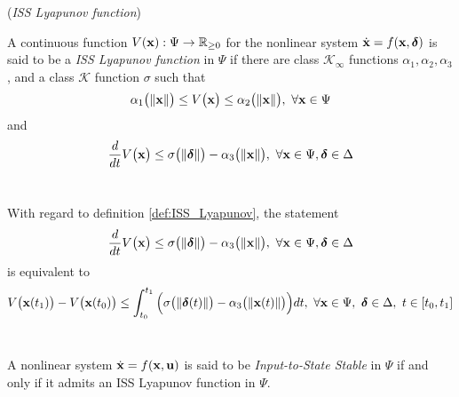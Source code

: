 \begin{definition}\cite{marquez2003nonlinear} (\textit{ISS Lyapunov function})
\label{def:ISS_Lyapunov}

A continuous function $V(\bm{\mathbf{x}}) : \Psi \to \mathbb{R}_{\geq 0}$ for the
nonlinear system $\dot{\bm{\mathbf{x}}} = f(\bm{\mathbf{x}}, \bm{\mathbf{\delta}})$ is said to be a
\textit{ISS Lyapunov function} in $\Psi$ if there are class
$\mathcal{K}_{\infty}$ functions
$\alpha_1, \alpha_2, \alpha_3$, and a class $\mathcal{K}$ function
$\sigma$ such that
\begin{align}
  \alpha_1\big(\|\bm{\mathbf{x}}\|\big) \leq V\big(\bm{\mathbf{x}}\big) \leq \alpha_2\big(\|\bm{\mathbf{x}}\|\big),\ \forall \bm{\mathbf{x}} \in \Psi
\end{align}
and
\begin{align}
  \dfrac{d}{dt}V\big(\bm{\mathbf{x}}\big)
    \leq \sigma\big(\|\bm{\mathbf{\delta}}\|\big) - \alpha_3\big(\|\bm{\mathbf{x}}\|\big),\ \forall \bm{\mathbf{x}} \in \Psi, \bm{\mathbf{\delta}} \in \Delta
\end{align}
\\[2.5ex]
\end{definition}


\begin{remark}
\label{remark:ISS_Lyapunov}

With regard to definition \eqref{def:ISS_Lyapunov}, the statement
\begin{align}
  \dfrac{d}{dt}V\big(\bm{\mathbf{x}}\big)
    \leq \sigma\big(\|\bm{\mathbf{\delta}}\|\big) - \alpha_3\big(\|\bm{\mathbf{x}}\|\big),\ \forall \bm{\mathbf{x}} \in \Psi, \bm{\mathbf{\delta}} \in \Delta
\end{align}
is equivalent to
\begin{align}
  V\big(\bm{\mathbf{x}}(t_1)\big) - V\big(\bm{\mathbf{x}}(t_0)\big)
  \leq \int_{t_0}^{t_1}\Big(\sigma\big(\|\bm{\mathbf{\delta}}(t)\|\big) - \alpha_3\big(\|\bm{\mathbf{x}}(t)\|\big)\Big)dt,\
    \forall \bm{\mathbf{x}} \in \Psi,\ \bm{\mathbf{\delta}} \in \Delta,\ t \in [t_0, t_1]
\end{align}
\\[2.5ex]
\end{remark}


\begin{theorem}\cite{marquez2003nonlinear}
\label{def:ISS_Lyapunov_admit_theorem}

  A nonlinear system $\dot{\bm{\mathbf{x}}} = f(\bm{\mathbf{x}},\bm{\mathbf{u}})$ is said
  to be \textit{Input-to-State Stable} in $\Psi$ if and only if it admits an
  ISS Lyapunov function in $\Psi$.
\\[2.5ex]
\end{theorem}


